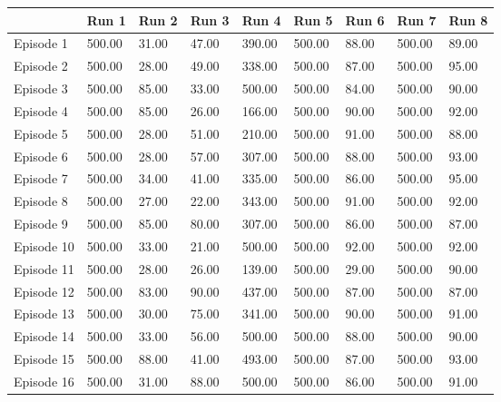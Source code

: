         \begin{table}[H]
        \begin{tabular}{l|l|l|l|l|l|l|l|l|}
        \cline{2-9}
                                         & Run 1 & Run 2 & Run 3 & Run 4 & Run 5    & Run 6& Run 7  & Run 8 \\ \hline
        \multicolumn{1}{|l|}{Episode 1}  & 500.00 & 31.00 & 47.00 & 390.00 & 500.00 & 88.00& 500.00 & 89.00\\
        \multicolumn{1}{|l|}{Episode 2}  & 500.00 & 28.00 & 49.00 & 338.00 & 500.00 & 87.00& 500.00 & 95.00\\
        \multicolumn{1}{|l|}{Episode 3}  & 500.00 & 85.00 & 33.00 & 500.00 & 500.00 & 84.00& 500.00 & 90.00\\
        \multicolumn{1}{|l|}{Episode 4}  & 500.00 & 85.00 & 26.00 & 166.00 & 500.00 & 90.00& 500.00 & 92.00\\
        \multicolumn{1}{|l|}{Episode 5}  & 500.00 & 28.00 & 51.00 & 210.00 & 500.00 & 91.00& 500.00 & 88.00\\
        \multicolumn{1}{|l|}{Episode 6}  & 500.00 & 28.00 & 57.00 & 307.00 & 500.00 & 88.00& 500.00 & 93.00\\
        \multicolumn{1}{|l|}{Episode 7}  & 500.00 & 34.00 & 41.00 & 335.00 & 500.00 & 86.00& 500.00 & 95.00\\
        \multicolumn{1}{|l|}{Episode 8}  & 500.00 & 27.00 & 22.00 & 343.00 & 500.00 & 91.00& 500.00 & 92.00\\
        \multicolumn{1}{|l|}{Episode 9}  & 500.00 & 85.00 & 80.00 & 307.00 & 500.00 & 86.00& 500.00 & 87.00\\
        \multicolumn{1}{|l|}{Episode 10} & 500.00 & 33.00 & 21.00 & 500.00 & 500.00 & 92.00& 500.00 & 92.00\\
        \multicolumn{1}{|l|}{Episode 11} & 500.00 & 28.00 & 26.00 & 139.00 & 500.00 & 29.00& 500.00 & 90.00\\
        \multicolumn{1}{|l|}{Episode 12} & 500.00 & 83.00 & 90.00 & 437.00 & 500.00 & 87.00& 500.00 & 87.00\\
        \multicolumn{1}{|l|}{Episode 13} & 500.00 & 30.00 & 75.00 & 341.00 & 500.00 & 90.00& 500.00 & 91.00\\
        \multicolumn{1}{|l|}{Episode 14} & 500.00 & 33.00 & 56.00 & 500.00 & 500.00 & 88.00& 500.00 & 90.00\\
        \multicolumn{1}{|l|}{Episode 15} & 500.00 & 88.00 & 41.00 & 493.00 & 500.00 & 87.00& 500.00 & 93.00\\
        \multicolumn{1}{|l|}{Episode 16} & 500.00 & 31.00 & 88.00 & 500.00 & 500.00 & 86.00& 500.00 & 91.00\\

\end{tabular}
\end{table}
